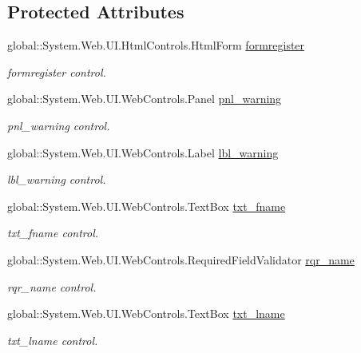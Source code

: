 \subsection*{Protected Attributes}
\begin{DoxyCompactItemize}
\item 
global\+::\+System.\+Web.\+U\+I.\+Html\+Controls.\+Html\+Form \mbox{\hyperlink{classregister_a8a2c5ccf4be2b84fc284840f7e005794}{formregister}}
\begin{DoxyCompactList}\small\item\em formregister control. \end{DoxyCompactList}\item 
global\+::\+System.\+Web.\+U\+I.\+Web\+Controls.\+Panel \mbox{\hyperlink{classregister_acaddf0eba66a6f81ad53750801f90d21}{pnl\+\_\+warning}}
\begin{DoxyCompactList}\small\item\em pnl\+\_\+warning control. \end{DoxyCompactList}\item 
global\+::\+System.\+Web.\+U\+I.\+Web\+Controls.\+Label \mbox{\hyperlink{classregister_a31768368486c20adfe2f982e694493e4}{lbl\+\_\+warning}}
\begin{DoxyCompactList}\small\item\em lbl\+\_\+warning control. \end{DoxyCompactList}\item 
global\+::\+System.\+Web.\+U\+I.\+Web\+Controls.\+Text\+Box \mbox{\hyperlink{classregister_a6830f183fcfc1e8c1bf08e053f4b5060}{txt\+\_\+fname}}
\begin{DoxyCompactList}\small\item\em txt\+\_\+fname control. \end{DoxyCompactList}\item 
global\+::\+System.\+Web.\+U\+I.\+Web\+Controls.\+Required\+Field\+Validator \mbox{\hyperlink{classregister_a3df4e9fab8d71055df7108ecdfc63686}{rqr\+\_\+name}}
\begin{DoxyCompactList}\small\item\em rqr\+\_\+name control. \end{DoxyCompactList}\item 
global\+::\+System.\+Web.\+U\+I.\+Web\+Controls.\+Text\+Box \mbox{\hyperlink{classregister_a18afcdd13cf247eabeea2657f5ee0f05}{txt\+\_\+lname}}
\begin{DoxyCompactList}\small\item\em txt\+\_\+lname control. \end{DoxyCompactList}\item 

\end{DoxyCompactItemize}
